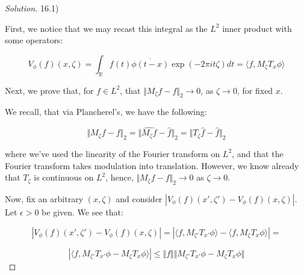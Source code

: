 \documentclass[10pt]{article}
\begin{document}
\begin{proof}[Solution]

16.1)

First, we notice that we may recast this integral as the $L^2$ inner product with some operators:

$$ V_\phi(f)(x, \zeta) = \int_{\mathbb{R}} f(t) \overline{\phi(t-x)} \exp(-2 \pi i t \zeta) dt  = \langle f, M_\zeta T_x \phi \rangle $$

Next, we prove that, for $f \in L^2$, that $\Vert M_\zeta f - f \Vert_2 \to 0$, as $\zeta \to 0$, for fixed $x$.

We recall, that via Plancherel's, we have the following:

$$ \Vert M_\zeta f - f \Vert_2 = \Vert \hat{M_\zeta f} - \hat{f} \Vert_2 = \Vert T_\zeta \hat{f} - \hat{f} \Vert_2 $$

where we've used the linearity of the Fourier transform on $L^2$, and that the Fourier transform takes modulation into translation. However, we know already that $T_\zeta$ is continuous on $L^2$, hence, $\Vert M_\zeta f - f \Vert_2 \to 0$ as $\zeta \to 0$.

Now, fix an arbitrary $(x, \zeta)$ and consider $|V_\phi(f)(x', \zeta') - V_\phi(f)(x, \zeta) |$. Let $\epsilon > 0$ be given. We see that:

$$ |V_\phi(f)(x', \zeta') - V_\phi(f)(x, \zeta) | = | \langle f, M_{\zeta'} T_{x'} \phi \rangle - \langle f, M_\zeta T_x \phi \rangle| = $$

$$ |\langle f, M_{\zeta'}T_{x'} \phi - M_\zeta T_x \phi \rangle | \leq \Vert f \Vert \Vert  M_{\zeta'}T_{x'} \phi - M_\zeta T_x \phi \Vert $$









\end{proof}
\end{document}

